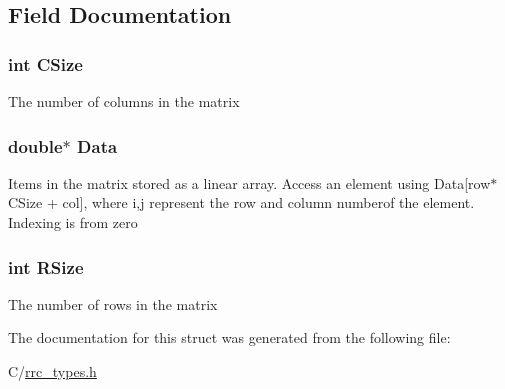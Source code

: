 \subsection{Field Documentation}
\hypertarget{struct_r_r_double_matrix_a17c9a5894aa9cb3789346dcaa9c370bb}{
\subsubsection[{C\-Size}]{\setlength{\rightskip}{0pt plus 5cm}int C\-Size}}\label{struct_r_r_double_matrix_a17c9a5894aa9cb3789346dcaa9c370bb}
The number of columns in the matrix \hypertarget{struct_r_r_double_matrix_a7c5cbda3aa940f4b0d6e8a1679307dfc}{
\subsubsection[{Data}]{\setlength{\rightskip}{0pt plus 5cm}double$\ast$ Data}}\label{struct_r_r_double_matrix_a7c5cbda3aa940f4b0d6e8a1679307dfc}
Items in the matrix stored as a linear array. Access an element using Data\mbox{[}row$\ast$\-C\-Size + col\mbox{]}, where i,j represent the row and column numberof the element. Indexing is from zero \hypertarget{struct_r_r_double_matrix_a4d8512c879223c0e0d1522dae38e7819}{
\subsubsection[{R\-Size}]{\setlength{\rightskip}{0pt plus 5cm}int R\-Size}}\label{struct_r_r_double_matrix_a4d8512c879223c0e0d1522dae38e7819}
The number of rows in the matrix 

The documentation for this struct was generated from the following file\-:\begin{DoxyCompactItemize}
\item 
C/\hyperlink{rrc__types_8h}{rrc\-\_\-types.\-h}\end{DoxyCompactItemize}
